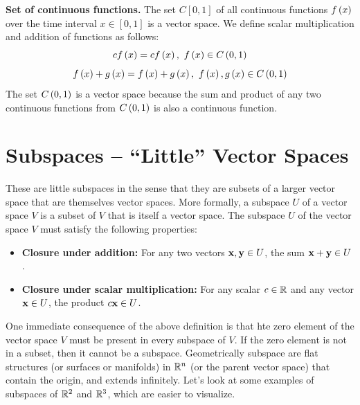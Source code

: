 \begin{boxedstuff}
\begin{example}
    \label{example:polynomial-vector-space}
\end{example}
\begin{example}
    \textbf{Set of continuous functions.} The set $C\left[0, 1\right]$ of all continuous functions $f\left( x\right)$ over the time interval $x \in \left[ 0, 1\right]$ is a vector space. We define scalar multiplication and addition of functions as follows:
    \[ c f\left( x \right) = c f\left( x \right), \,\, f\left( x \right) \in C\left( 0, 1 \right) \]
    \[ f\left( x \right) + g\left( x \right) = f\left( x \right) + g\left( x \right), \,\, f\left( x \right), g\left( x \right) \in C\left( 0, 1 \right) \]
    The set $C\left( 0, 1 \right)$ is a vector space because the sum and product of any two continuous functions from $C\left( 0, 1 \right)$ is also a continuous function.
    \label{example:continuous-function-vector-space}
\end{example}
\end{boxedstuff}

\section{Subspaces -- ``Little'' Vector Spaces}
These are little subspaces in the sense that they are subsets of a larger vector space that are themselves vector spaces. More formally, a subspace $U$ of a vector space $V$ is a subset of $V$ that is itself a vector space. The subspace $U$ of the vector space $V$ must satisfy the following properties:
\begin{itemize}
    \item \textbf{Closure under addition:} For any two vectors $\mathbf{x}, \mathbf{y} \in U$, the sum $\mathbf{x} + \mathbf{y} \in U$.
    \item \textbf{Closure under scalar multiplication:} For any scalar $c \in \mathbb{R}$ and any vector $\mathbf{x} \in U$, the product $c\mathbf{x} \in U$.
\end{itemize}
One immediate consequence of the above definition is that hte zero element of the vector space $V$ must be present in every subspace of $V$. If the zero element is not in a subset, then it cannot be a subspace. Geometrically subspace are flat structures (or surfaces or manifolds) in $\mathbb{R}^n$ (or the parent vector space) that contain the origin, and extends infinitely. Let's look at some examples of subspaces of $\mathbb{R}^2$ and $\mathbb{R}^3$, which are easier to visualize.

